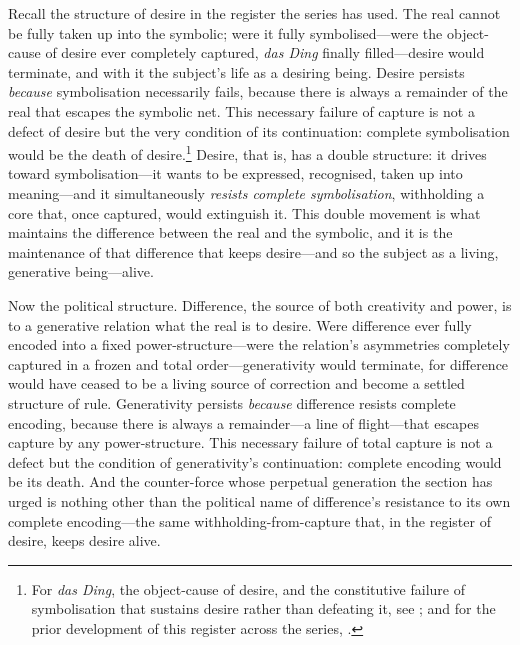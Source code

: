 Recall the structure of desire in the register the series has used. The real cannot be fully taken up into the symbolic; were it fully symbolised---were the object-cause of desire ever completely captured, \emph{das Ding} finally filled---desire would terminate, and with it the subject's life as a desiring being. Desire persists \emph{because} symbolisation necessarily fails, because there is always a remainder of the real that escapes the symbolic net. This necessary failure of capture is not a defect of desire but the very condition of its continuation: complete symbolisation would be the death of desire.\footnote{For \emph{das Ding}, the object-cause of desire, and the constitutive failure of symbolisation that sustains desire rather than defeating it, see \textcite{lacan2006}; and for the prior development of this register across the series, \textcite{paperix}.} Desire, that is, has a double structure: it drives toward symbolisation---it wants to be expressed, recognised, taken up into meaning---and it simultaneously \emph{resists complete symbolisation}, withholding a core that, once captured, would extinguish it. This double movement is what maintains the difference between the real and the symbolic, and it is the maintenance of that difference that keeps desire---and so the subject as a living, generative being---alive.

Now the political structure. Difference, the source of both creativity and power, is to a generative relation what the real is to desire. Were difference ever fully encoded into a fixed power-structure---were the relation's asymmetries completely captured in a frozen and total order---generativity would terminate, for difference would have ceased to be a living source of correction and become a settled structure of rule. Generativity persists \emph{because} difference resists complete encoding, because there is always a remainder---a line of flight---that escapes capture by any power-structure. This necessary failure of total capture is not a defect but the condition of generativity's continuation: complete encoding would be its death. And the counter-force whose perpetual generation the section has urged is nothing other than the political name of difference's resistance to its own complete encoding---the same withholding-from-capture that, in the register of desire, keeps desire alive.

